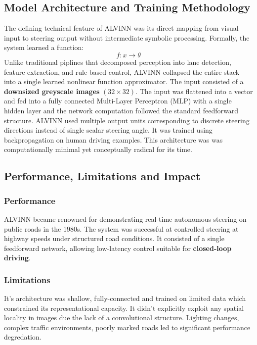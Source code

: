 \documentclass[11pt,a4paper]{report}
\begin{document}
\subsection{Model Architecture and Training Methodology}
The defining technical feature of ALVINN was its direct mapping from visual input to steering output without
intermediate symbolic processing. Formally, the system learned a function: 
\begin{equation*}
f: x \to \theta
\end{equation*}
Unlike traditional piplines that decomposed perception into lane detection, feature extraction, and rule-based control,
ALVINN collapsed the entire stack into a single learned nonlinear function approximator. The input consisted of a
\textbf{downsized greyscale images} $(32 \times 32)$. The input was flattened into a vector and fed into a fully
connected Multi-Layer Perceptron (MLP) with a single hidden layer and the network computation followed the standard
feedforward structure. ALVINN used multiple output units corresponding to discrete steering directions instead of single
scalar steering angle. It was trained using backpropagation on human driving examples. This architecture was was computationally
minimal yet conceptually radical for its time.

\subsection{Performance, Limitations and Impact}

\subsubsection{Performance}
ALVINN became renowned for demonstrating real-time autonomous steering on public roads in the 1980s. The system
was successful at controlled steering at highway speeds under structured road conditions. It consisted of a single
feedforward network, allowing low-latency control suitable for \textbf{closed-loop driving}. 

\subsubsection{Limitations}
It's architecture was shallow, fully-connected and trained on limited data which constrained its representational
capacity. It didn't explicitly exploit any spatial locality in images due the lack of a convolutional structure.
Lighting changes, complex traffic environments, poorly marked roads led to significant performance degredation.
\end{document}
